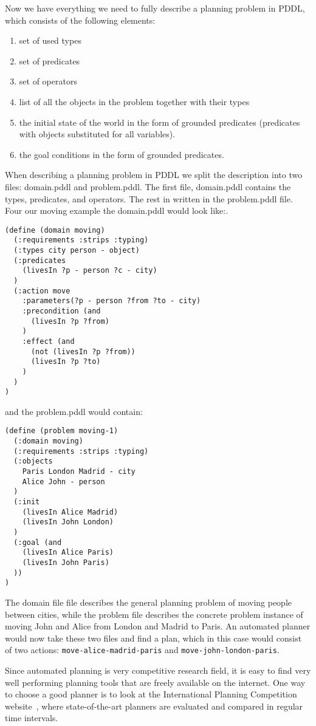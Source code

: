 \documentclass[runningheads]{llncs}
\begin{document}
Now we have everything we need to fully describe a planning problem in PDDL, which consists of the following
elements:
\begin{enumerate}
\item set of used types
\item set of predicates
\item set of operators
\item list of all the objects in the problem together with their types
\item the initial state of the world in the form of grounded predicates (predicates with objects substituted for
all variables).
\item the goal conditions in the form of grounded predicates.
\end{enumerate}

When describing a planning problem in PDDL we split the description into two files: domain.pddl and problem.pddl.
The first file, domain.pddl contains the types, predicates, and operators. The rest in written in the problem.pddl
file. Four our moving example the domain.pddl would look like:.

\begin{verbatim}
(define (domain moving)
  (:requirements :strips :typing)
  (:types city person - object)
  (:predicates
    (livesIn ?p - person ?c - city)
  )
  (:action move
    :parameters(?p - person ?from ?to - city)
    :precondition (and
      (livesIn ?p ?from)
    )
    :effect (and
      (not (livesIn ?p ?from))
      (livesIn ?p ?to)
    )
  )
)
\end{verbatim}
and the problem.pddl would contain:
\begin{verbatim}
(define (problem moving-1)
  (:domain moving)
  (:requirements :strips :typing)
  (:objects
    Paris London Madrid - city
    Alice John - person
  )
  (:init
    (livesIn Alice Madrid)
    (livesIn John London)
  )
  (:goal (and
    (livesIn Alice Paris)
    (livesIn John Paris)
  ))  
)
\end{verbatim}
The domain file file describes the general planning problem of moving people between cities, while the problem
file describes the concrete problem instance of moving John and Alice from London and Madrid to Paris.
An automated planner would now take these two files and find a plan, which in this case would consist of two
actions: \verb _move-alice-madrid-paris_ and \verb _move-john-london-paris_.

Since automated planning is very competitive research field, it is easy to find very well performing
planning tools that are freely available on the internet. One way to choose a good planner is to look
at the International Planning Competition website~\cite{TODO}, where state-of-the-art planners are evaluated 
and compared in regular time intervals.
\end{document}
